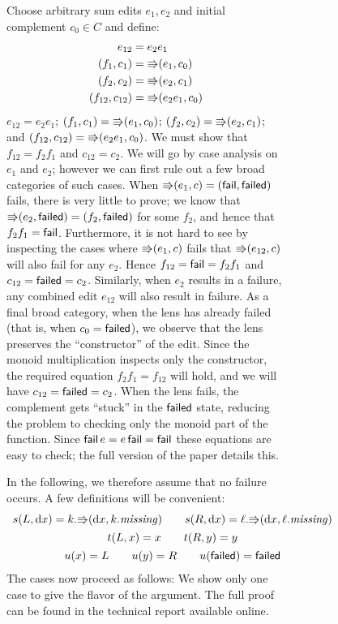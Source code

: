 \begin{figure}
\begin{figure}
\begin{pf}
    Choose arbitrary sum edits $e_1,e_2$ and initial complement $c_0 \in C$
    and define:
\iffull
    \begin{align*}
        e_{12} &= e_2e_1 \\
        (f_1,c_1) &= \mathord{\Rrightarrow}(e_1,c_0) \\
        (f_2,c_2) &= \mathord{\Rrightarrow}(e_2,c_1) \\
        (f_{12},c_{12}) &= \mathord{\Rrightarrow}(e_2e_1,c_0)
    \end{align*}
\else
$e_{12} = e_2e_1$; 
$(f_1,c_1) = \mathord{\Rrightarrow}(e_1,c_0)$;
$(f_2,c_2) = \mathord{\Rrightarrow}(e_2,c_1)$; and
$(f_{12},c_{12}) = \mathord{\Rrightarrow}(e_2e_1,c_0)$.
\fi
    We must show that $f_{12}=f_2f_1$ and $c_{12}=c_2$. We will go by case
    analysis on $e_1$ and $e_2$; however we can first rule out a few broad
    categories of such cases.
    \iffull
    When
    $\mathord{\Rrightarrow}(e_1,c)=(\mathsf{fail},\mathsf{failed})$ fails, there is very little to prove;
    we know that $\mathord{\Rrightarrow}(e_2,\mathsf{failed})=(f_2,\mathsf{failed})$ for some $f_2$, and
    hence that $f_2f_1=\mathsf{fail}$. Furthermore, it is not hard to see by
    inspecting the cases where $\mathord{\Rrightarrow}(e_1,c)$ fails that $\mathord{\Rrightarrow}(e_{12},c)$
    will also fail for any $e_2$. Hence $f_{12}=\mathsf{fail}=f_2f_1$ and
    $c_{12}=\mathsf{failed}=c_2$. Similarly, when $e_2$ results in a failure, any
    combined edit $e_{12}$ will also result in failure.  As a final broad
    category, when the lens has already failed (that is, when
    $c_0=\mathsf{failed}$), we observe that the lens preserves the ``constructor''
    of the edit. Since the monoid multiplication inspects only the
    constructor, the required equation $f_2f_1=f_{12}$ will hold, and we
    will have $c_{12}=\mathsf{failed}=c_2$.
    \else
    When the lens fails, the complement gets ``stuck'' in the
    $\mathsf{failed}$ state, reducing the problem to checking only the monoid
    part of the function. Since $\mathsf{fail}\,e=e\,\mathsf{fail}=\mathsf{fail}$ these
    equations are easy to check\iflater; the full version of the paper details this\fi.
    \fi

    In the following, we therefore assume that no failure occurs.
    A few definitions will be convenient:  
\[
\begin{array}{c}
        s(L,\textrm{d} x) = k.\mathord{\Rrightarrow}(\textrm{d} x,k.\mathit{missing}) \qquad
        s(R,\textrm{d} x) = \ell.\mathord{\Rrightarrow}(\textrm{d} x,\ell.\mathit{missing}) \\[1ex]
        t(L,x) =  x \qquad 
        t(R,y) =  y \\[1ex]
        u( x) = L \qquad
        u( y) = R \qquad
        u(\mathsf{failed}) = \mathsf{failed}
\end{array}
\]
    \iffull
    The cases now proceed as follows:
    \else
    We show only one case to give the flavor of the argument. \iflater The full proof
    can be found in the technical report available online.\fi
    \fi
    \begin{trivlist} \item[] 


\end{trivlist}
\end{pf}
\end{figure}
\end{figure}
